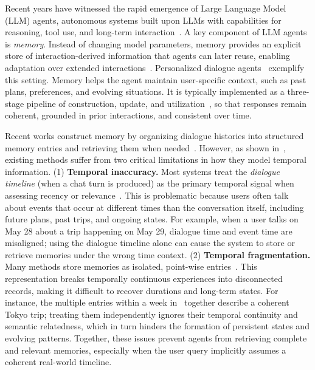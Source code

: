 \documentclass[11pt]{article}
\begin{document}
Recent years have witnessed the rapid emergence of Large Language Model (LLM) agents, autonomous systems built upon LLMs with capabilities for reasoning, tool use, and long-term interaction~\cite{matarazzo_survey_2025,minaee_large_2025,luo_large_2025}. 
A key component of LLM agents is \textit{memory}. Instead of changing model parameters, memory provides an explicit store of interaction-derived information that agents can later reuse, enabling adaptation over extended interactions~\cite{sumers2023cognitive,wu_human_2025}. 
Personalized dialogue agents~\cite{chhikara2025mem0, li_hello_2025} exemplify this setting. Memory helps the agent maintain user-specific context, such as past plans, preferences, and evolving situations. 
It is typically implemented as a three-stage pipeline of construction, update, and utilization~\cite{hu_memory_2025}, so that responses remain coherent, grounded in prior interactions, and consistent over time.


Recent works construct memory by organizing dialogue histories into structured memory entries and retrieving them when needed~\cite{zhong_memorybank_2023, kim_pre-storage_2025, tan_prospect_2025, sun_hierarchical_2025}. 
However, as shown in~, existing methods suffer from two critical limitations in how they model temporal information.
(1) \textbf{Temporal inaccuracy.} Most systems treat the \emph{dialogue timeline} (when a chat turn is produced) as the primary temporal signal when assessing recency or relevance~\cite{rasmussen_zep_2025}. 
This is problematic because users often talk about events that occur at different times than the conversation itself, including future plans, past trips, and ongoing states. 
For example, when a user talks on May 28 about a trip happening on May 29, dialogue time and event time are misaligned; using the dialogue timeline alone can cause the system to store or retrieve memories under the wrong time context.
(2) \textbf{Temporal fragmentation.} Many methods store memories as isolated, point-wise entries~\cite{tan_prospect_2025, fang_lightmem_2025,chhikara_mem0_2025,rasmussen_zep_2025}. 
This representation breaks temporally continuous experiences into disconnected records, making it difficult to recover durations and long-term states.
For instance, the multiple entries within a week in~ together describe a coherent Tokyo trip; treating them independently ignores their temporal continuity and semantic relatedness, which in turn hinders the formation of persistent states and evolving patterns.
Together, these issues prevent agents from retrieving complete and relevant memories, especially when the user query implicitly assumes a coherent real-world timeline.
\end{document}
